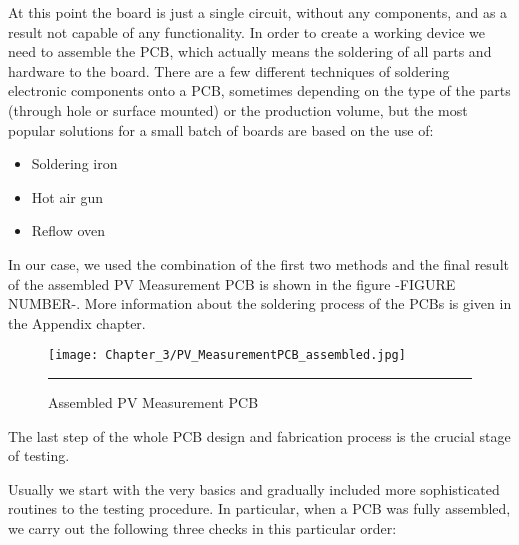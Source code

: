 At this point the board is just a single circuit, without any components, and as a result not capable of any functionality. In order to create a working device we need to assemble the PCB, which actually means the soldering of all parts and hardware to the board. There are a few different techniques of soldering electronic components onto a PCB, sometimes depending on the type of the parts (through hole or surface mounted) or the production volume, but the most popular solutions for a small batch of boards are based on the use of:

\begin{itemize}
    \item Soldering iron
    \item Hot air gun
    \item Reflow oven
\end{itemize}

In our case, we used the combination of the first two methods and the final result of the assembled PV Measurement PCB is shown in the figure -FIGURE NUMBER-. More information about the soldering process of the PCBs is given in the Appendix chapter.\\


\begin{figure}[htbp]
	\centering
		\texttt{[image: Chapter\_3/PV\_MeasurementPCB\_assembled.jpg]}
		\rule{35em}{0.5pt}
	\caption{Assembled PV Measurement PCB}
	\label{fig:PV_MeasurementPCB_assembled}
\end{figure}

The last step of the whole PCB design and fabrication process is the crucial stage of testing. 

Usually we start with the very basics and gradually included more sophisticated routines to the testing procedure. In particular, when a PCB was fully assembled, we carry out the following three checks in this particular order: 

